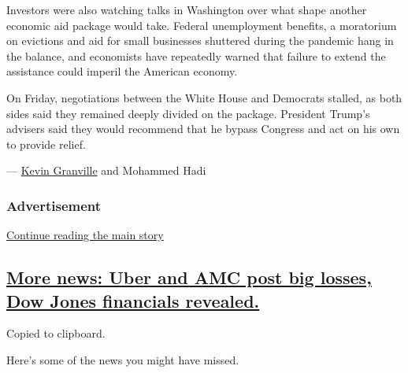Investors were also watching talks in Washington over what shape another
economic aid package would take. Federal unemployment benefits, a
moratorium on evictions and aid for small businesses shuttered during
the pandemic hang in the balance, and economists have repeatedly warned
that failure to extend the assistance could imperil the American
economy.

On Friday, negotiations between the White House and Democrats stalled,
as both sides said they remained deeply divided on the package.
President Trump's advisers said they would recommend that he bypass
Congress and act on his own to provide relief.

--- \href{https://www.nytimes.com/by/kevin-granville}{Kevin Granville}
and Mohammed Hadi

\hypertarget{advertisement-2}{%
\subsubsection{Advertisement}\label{advertisement-2}}

\protect\hyperlink{after-dfp-ad-mid3}{Continue reading the main story}

\hypertarget{more-news-uber-and-amc-post-big-losses-dow-jones-financials-revealed}{%
\subsection{\texorpdfstring{\protect\hyperlink{more-news-uber-and-amc-post-big-losses-dow-jones-financials-revealed}{More
news: Uber and AMC post big losses, Dow Jones financials
revealed.}}{More news: Uber and AMC post big losses, Dow Jones financials revealed.}}\label{more-news-uber-and-amc-post-big-losses-dow-jones-financials-revealed}}

Copied to clipboard.

Here's some of the news you might have missed.

